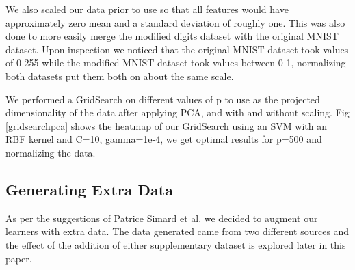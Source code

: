 \documentclass[conference]{IEEEtran}
\begin{document}
We also scaled our data prior to use so that all features would have approximately zero mean and a standard deviation of roughly one. This was also done to more easily merge the modified digits dataset with the original MNIST dataset. Upon inspection we noticed that the original MNIST dataset took values of 0-255 while the modified MNIST dataset took values between 0-1, normalizing both datasets put them both on about the same scale. 

We performed a GridSearch on different values of p to use as the projected dimensionality of the data after applying PCA, and with and without scaling. Fig \ref{gridsearchpca} shows the heatmap of our GridSearch using an SVM with an RBF kernel and C=10, gamma=1e-4, we get optimal results for p=500 and normalizing the data. 

\subsection{Generating Extra Data}

As per the suggestions of Patrice Simard et al. \cite{Simard} we decided to augment our learners with extra data. The data generated came from two different sources and the effect of the addition of either supplementary dataset is explored later in this paper.
\end{document}
